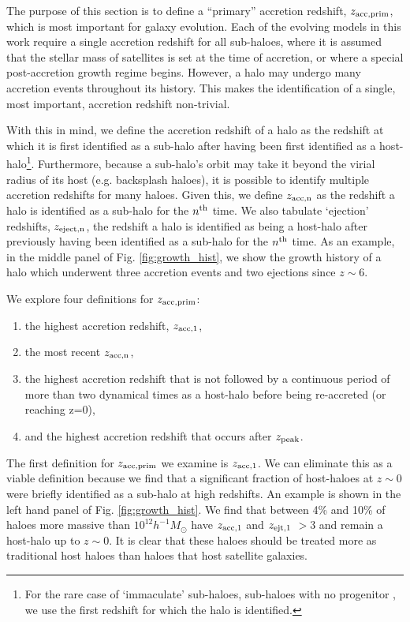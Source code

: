 \documentclass[a4paper,fleqn,usenatbib]{mnras}
\begin{document}
The purpose of this section is to define a ``primary'' accretion redshift, $z_{\rm acc, prim}$, which is most important for galaxy evolution.  Each of the evolving models in this work require a single accretion redshift for all sub-haloes, where it is assumed that the stellar mass of satellites is set at the time of accretion, or where a special post-accretion growth regime begins.  However, a halo may undergo many accretion events throughout its history.  This makes the identification of a single, most important, accretion redshift non-trivial.

With this in mind, we define the accretion redshift of a halo as the redshift at which it is first identified as a sub-halo after having been first identified as a host-halo\footnote{For the rare case of `immaculate' sub-haloes, sub-haloes with no progenitor \citep{vandenBosch:2016uv}, we use the first redshift for which the halo is identified.}.  Furthermore, because a sub-halo's orbit may take it beyond the virial radius of its host (e.g. backsplash haloes), it is possible to identify multiple accretion redshifts for many haloes.  Given this, we define $z_{\rm acc,n}$ as the redshift a halo is identified as a sub-halo for the $n^{\rm th}$ time.  We also tabulate `ejection' redshifts, $z_{\rm eject, n}$, the redshift a halo is identified as being a host-halo after previously having been identified as a sub-halo for the $n^{\rm th}$ time.  As an example, in the middle panel of Fig. \ref{fig:growth_hist}, we show the growth history of a halo which underwent three accretion events and two ejections since $z \sim 6$.

We explore four definitions for $z_{\rm acc, prim}$:
\begin{enumerate}
\item the highest accretion redshift, $z_{\rm acc,1}$, 
\item the most recent $z_{\rm acc, n}$, 
\item the highest accretion redshift that is not followed by a continuous period of more than two dynamical times as a host-halo before being re-accreted (or reaching z=0),
\item and the highest accretion redshift that occurs after $z_{\rm peak}$.  
\end{enumerate}

The first definition for $z_{\rm acc, prim}$ we examine is $z_{\rm acc,1}$.  We can eliminate this as a viable definition because we find that a significant fraction of host-haloes at $z\sim0$ were briefly identified as a sub-halo at high redshifts.  An example is shown in the left hand panel of Fig. \ref{fig:growth_hist}.  We find that between 4\% and 10\% of haloes more massive than $10^{12}h^{-1}M_{\odot}$ have $z_{\rm acc,1}$ and $z_{\rm ejt,1}$ $>3$ and remain a host-halo up to $z\sim0$.  It is clear that these haloes should be treated more as traditional host haloes than haloes that host satellite galaxies.   
\end{document}
